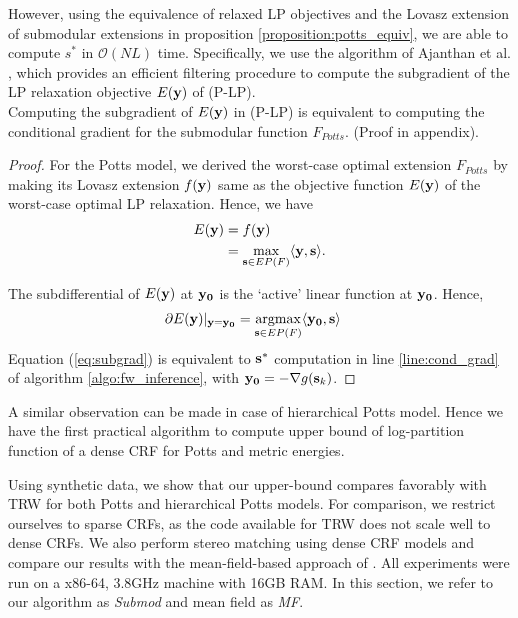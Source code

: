 However, using the equivalence of relaxed LP objectives and the Lovasz
extension of submodular extensions in proposition
\ref{proposition:potts_equiv}, we are able to compute $s^*$ in ${\mathcal
O}(NL)$ time. Specifically, we use the algorithm of
Ajanthan et al. \citep{ajanthan2017efficient}, which provides an efficient filtering procedure to compute the subgradient of the LP relaxation objective $E({\bf y})$ of (P-LP).\\
%
\vspace{-0.5cm}
{\proposition Computing the subgradient of $E({\bf y})$ in (P-LP) is equivalent to computing the conditional gradient for the submodular function $F_{Potts}$. \label{proposition:subgrad}} 
\newline(Proof in appendix).
\begin{proof}
  For the Potts model, we derived the worst-case optimal extension $F_{Potts}$ by
  making its Lovasz extension $f({\bf y})$ same as the objective function
    $E({\bf y})$ of the worst-case optimal LP relaxation. Hence, we have
\begin{align}
    E({\bf y}) &= f({\bf y})  \nonumber \\
    {} &=  \max_{{\bf s} \in EP(F)} \langle {\bf y}, {\bf s} \rangle.\nonumber
\end{align}

The subdifferential of $E({\bf y})$ at $\bf y_0$ is the `active' linear function at $\bf y_0$. Hence,
\begin{align}
    \partial E({\bf y})|_{\bf y = y_0} &=  \argmax_{{\bf s} \in EP(F)} \langle {\bf y_0}, {\bf s} \rangle
    \label{eq:subgrad}
\end{align}
Equation (\ref{eq:subgrad}) is equivalent to ${\bf s}^*$ computation in line \ref{line:cond_grad} of algorithm \ref{algo:fw_inference}, with ${\bf y_0} = - \nabla g({\bf s}_k)$.
\end{proof}

A similar observation can be made in case of hierarchical Potts model. Hence we have the first practical algorithm to compute upper bound of log-partition function of a dense CRF for Potts and metric energies.

\label{sec:exp}
Using synthetic data, we show that our upper-bound compares favorably with TRW
for both Potts and hierarchical Potts models. For comparison, we restrict
ourselves to sparse CRFs, as the code available for TRW does not scale well to
dense CRFs. We also perform stereo matching using dense CRF models and compare
our results with the mean-field-based approach of \citep{koltun2011efficient}.
All experiments were run on a x86-64, 3.8GHz machine with 16GB RAM. In this
section, we refer to our algorithm as \emph{Submod} and mean field as \emph{MF}. 

